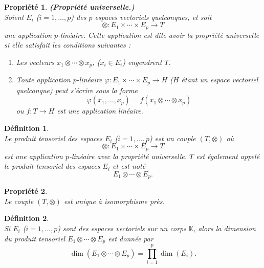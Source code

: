 \documentclass[a4paper, 14pt]{report}
\newtheorem{definition}{Définition}[section]
\newtheorem{propriety}{Propriété}[section]
\begin{document}
\begin{onehalfspace}
{			\begin{propriety}\textbf{(Propriété universelle.)} \cite{greub2012linear}\\
				Soient \( E_i \) (\( i = 1, \ldots, p \)) des \( p \) espaces vectoriels quelconques, et soit
				\[
				\otimes : E_1 \times \cdots \times E_p \to T
				\]
				une application \( p \)-linéaire. Cette application est dite avoir la \textit{propriété universelle} si elle satisfait les conditions suivantes :
				\begin{enumerate} [label=\roman*)]
					\item Les vecteurs \( x_1 \otimes \cdots \otimes x_p \), (\( x_i \in E_i \)) engendrent \( T \).
					\item Toute application \( p \)-linéaire \( \varphi : E_1 \times \cdots \times E_p \to H \) (\( H \) étant un espace vectoriel quelconque) peut s'écrire sous la forme
					\[
					\varphi(x_1, \ldots, x_p) = f(x_1 \otimes \cdots \otimes x_p)
					\]
					ou \( f : T \to H \) est une application linéaire.
				\end{enumerate}
			\end{propriety}
			
			\begin{definition} \cite{greub2012linear}\\
				Le produit tensoriel des espaces \( E_i \) (\( i = 1, \ldots, p \)) est un couple \( (T, \otimes) \) où
				\[
				\otimes : E_1 \times \cdots \times E_p \to T
				\]
				est une application \( p \)-linéaire avec la propriété universelle. \( T \) est également appelé le produit tensoriel des espaces \( E_i \) et est noté
				\[
				E_1 \otimes \cdots \otimes E_p.
				\]
			\end{definition}
			
			\begin{propriety} \cite{greub2012linear}\\
				Le couple \( (T, \otimes) \) est unique à isomorphisme près.
			\end{propriety}
			
			
			\begin{definition} \cite{greub2012linear}\\
				Si \( E_i \) (\( i = 1, \ldots, p \)) sont des espaces vectoriels sur un corps \( \mathbb{K} \), alors la dimension du produit tensoriel \( E_1 \otimes \cdots \otimes E_p \) est donnée par 
				\[
				\dim(E_1 \otimes \cdots \otimes E_p) = \prod_{i=1}^p \dim(E_i).
				\]
			\end{definition}
			
}
\end{onehalfspace}
\end{document}
